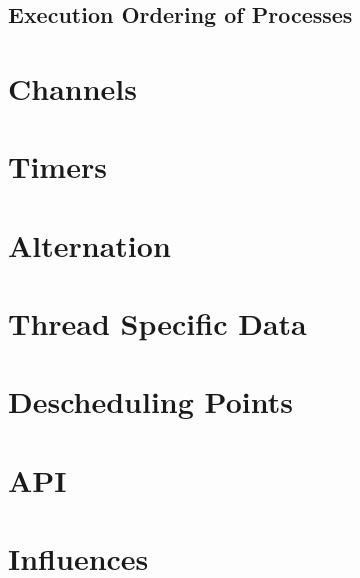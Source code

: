 \subsection{Execution Ordering of Processes}




\section{Channels}




\section{Timers}




\section{Alternation}




\section{Thread Specific Data}
\label{sec:thread_specific_data}




\section{Descheduling Points}




\section{API}




\section{Influences}



